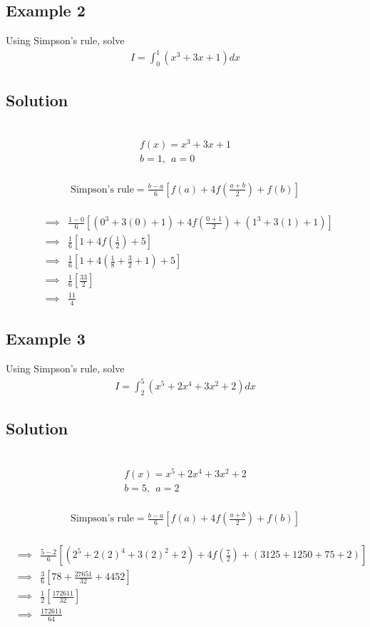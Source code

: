 \documentclass[12pt]{report}
\newcommand{\sps}{\\[0.2cm]}
\begin{document}
	
	\subsection{Example 2}
	Using Simpson's rule, solve
	\begin{eqnarray*}
		I = \int_0^1\left(x^3 +3x + 1\right)dx
	\end{eqnarray*}
	
	\subsection*{Solution}
	{~}\\[-2.1cm]
	\begin{gather*}
		f(x) = x^3 +3x + 1\sps
		b=1,~~ a=0
	\end{gather*}
	{~}\\[-2.1cm]
	\begin{gather*}
		\text{Simpson's rule} = \frac{b-a}{6}\left[f(a)+ 4f\left(\frac{a+b}{2}\right) + f(b)\right]
	\end{gather*}
	{~}\\[-2.1cm]
	\begin{eqnarray*}
		&\implies&\frac{1-0}{6}\left[(0^3 + 3(0) + 1) + 4f\left(\frac{0+1}{2}\right)+ (1^3 + 3(1) + 1)\right]\sps
		&\implies& \frac{1}{6}\left[1+4f\left(\frac{1}{2}\right)+5\right]\sps
		&\implies&\frac{1}{6}\left[1+4\left(\frac{1}{8}+\frac{3}{2}+1\right)+5\right]\sps
		&\implies&\frac{1}{6}\left[\frac{33}{2}\right]\sps
		&\implies& \frac{11}{4}
	\end{eqnarray*}
	
	
	\subsection{Example 3}
	Using Simpson's rule, solve
	\begin{eqnarray*}
		I = \int_2^5\left(x^5 + 2x^4 + 3x^2 + 2\right)dx
	\end{eqnarray*}
	
	\subsection*{Solution}
	{~}\\[-1.9cm]
	\begin{gather*}
		f(x) = x^5 + 2x^4 + 3x^2 + 2\\[-0.2cm]
		b=5,~~ a=2
	\end{gather*}
	{~}\\[-1.9cm]
	\begin{gather*}
		\text{Simpson's rule} = \frac{b-a}{6}\left[f(a)+ 4f\left(\frac{a+b}{2}\right) + f(b)\right]
	\end{gather*}
	{~}\\[-1.5cm]
	\begin{eqnarray*}
		&\implies& \frac{5-2}{6}\left[(2^5 + 2(2)^4 + 3(2)^2 + 2) + 4f\left(\frac{7}{2}\right) + (3125+1250+75+2)\right]\sps
		&\implies&\frac{3}{6}\left[78+\frac{27651}{32}+ 4452\right]\sps
		&\implies& \frac{1}{2}\left[\frac{172611}{32}\right]\sps
		&\implies& \frac{172611}{64}
	\end{eqnarray*}
\end{document}
